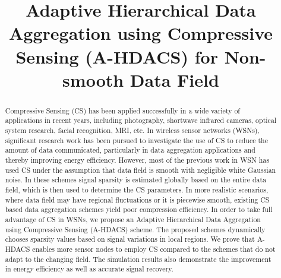 \documentclass[conference]{IEEEtran}
\begin{document}
\title{Adaptive Hierarchical Data Aggregation using Compressive Sensing (A-HDACS) for Non-smooth Data Field}

\author{
\and
{}
\and
{}
}


\maketitle


\begin{abstract}
Compressive Sensing (CS) has been applied successfully in a wide variety of 
applications in recent years, including photography, shortwave infrared cameras,
optical system research, facial recognition, MRI, etc. In wireless sensor networks (WSNs), 
significant research work has been pursued to investigate the use of CS to 
reduce the amount of data communicated, particularly in data aggregation applications 
and thereby improving energy efficiency. 
However, most of the previous work in WSN has used CS under the assumption that data 
field is smooth with negligible white Gaussian noise. In these schemes signal 
sparsity is estimated globally based on the entire data field, which is then used to determine the CS parameters.
In more realistic scenarios, where data field may have regional fluctuations or it is 
piecewise smooth, existing  CS based data aggregation schemes yield poor compression efficiency.   
In order to take full advantage of CS in WSNs,
we propose an Adaptive Hierarchical Data Aggregation using Compressive Sensing
(A-HDACS) scheme. The proposed schemes dynamically chooses sparsity values based on signal variations
in local regions. We prove that A-HDACS enables more sensor nodes to employ CS compared 
to the schemes that do not adapt to the changing field. 
The simulation results also demonstrate the improvement in energy efficiency as well 
as accurate signal recovery. 

\end{abstract}
\end{document}
